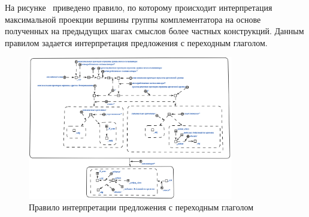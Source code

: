 На рисунке~\textit{} приведено правило, по которому происходит интерпретация максимальной проекции вершины группы комплементатора на основе полученных на предыдущих шагах смыслов более частных конструкций. Данным правилом задается интерпретация предложения с переходным глаголом.

\begin{figure}[h]
    \centering
    \includegraphics[width=0.8\textwidth]{images/part2/chapter_lang/d_sem_7.png}
    \caption{Правило интерпретации предложения с переходным глаголом}
    \label{fig:d_sem_7}
\end{figure}

%